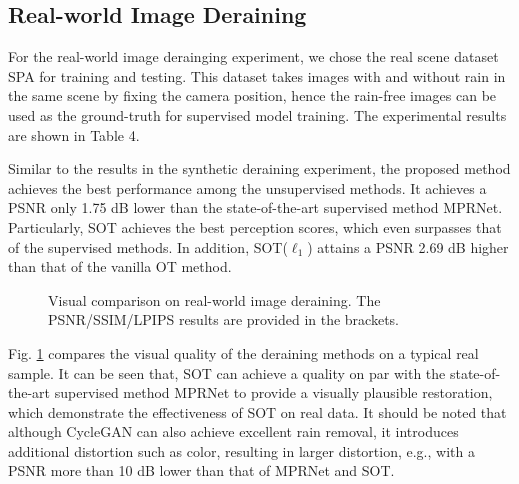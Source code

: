 \documentclass[10pt,journal,compsoc]{IEEEtran}
\begin{document}
\subsection{Real-world Image Deraining}

For the real-world image derainging experiment, 
we chose the real scene dataset SPA \cite{spa} for training and testing. 
This dataset takes images with and without rain in the same scene by 
fixing the camera position, hence the rain-free images can be used as 
the ground-truth for supervised model training. The experimental results 
are shown in Table 4.

Similar to the results in the synthetic deraining experiment,
the proposed method achieves the best performance among the unsupervised methods. 
It achieves a PSNR only 1.75 dB lower than  
the state-of-the-art supervised method MPRNet.
Particularly, SOT achieves the best perception scores, 
which even surpasses that of the supervised methods.
In addition, SOT($\ell_1$) attains a PSNR 2.69 dB higher than
that of the vanilla OT method.

\begin{figure}[!t]
	\centering
	\caption{Visual comparison on real-world image deraining. The PSNR/SSIM/LPIPS results are provided in the brackets. }
	\label{figure5}
\end{figure}

Fig. \ref{figure5} compares the visual quality of 
the deraining methods on a typical real sample. 
It can be seen that, SOT can achieve a quality 
on par with the state-of-the-art supervised method MPRNet
to provide a visually plausible restoration, which
demonstrate the effectiveness of SOT on real data.
It should be noted that although CycleGAN can also achieve 
excellent rain removal, it introduces additional distortion such as color, 
resulting in larger distortion, e.g., with a PSNR more 
than 10 dB lower than that of MPRNet and SOT.
\end{document}
